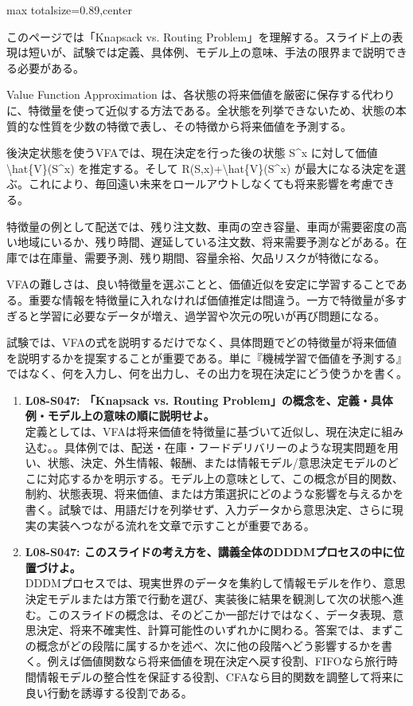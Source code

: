 \begin{minipage}[t]{0.58\textwidth}
\begin{adjustbox}{max totalsize={\textwidth}{0.89\textheight},center}
\begin{minipage}{\textwidth}\scriptsize
{}このページでは「Knapsack vs. Routing Problem」を理解する。スライド上の表現は短いが、試験では定義、具体例、モデル上の意味、手法の限界まで説明できる必要がある。\par
Value Function Approximation は、各状態の将来価値を厳密に保存する代わりに、特徴量を使って近似する方法である。全状態を列挙できないため、状態の本質的な性質を少数の特徴で表し、その特徴から将来価値を予測する。\par
後決定状態を使うVFAでは、現在決定を行った後の状態 S\textasciicircum{}x に対して価値 \textbackslash{}hat\{V\}(S\textasciicircum{}x) を推定する。そして R(S,x)+\textbackslash{}hat\{V\}(S\textasciicircum{}x) が最大になる決定を選ぶ。これにより、毎回遠い未来をロールアウトしなくても将来影響を考慮できる。\par
特徴量の例として配送では、残り注文数、車両の空き容量、車両が需要密度の高い地域にいるか、残り時間、遅延している注文数、将来需要予測などがある。在庫では在庫量、需要予測、残り期間、容量余裕、欠品リスクが特徴になる。\par
VFAの難しさは、良い特徴量を選ぶことと、価値近似を安定に学習することである。重要な情報を特徴量に入れなければ価値推定は間違う。一方で特徴量が多すぎると学習に必要なデータが増え、過学習や次元の呪いが再び問題になる。\par
試験では、VFAの式を説明するだけでなく、具体問題でどの特徴量が将来価値を説明するかを提案することが重要である。単に『機械学習で価値を予測する』ではなく、何を入力し、何を出力し、その出力を現在決定にどう使うかを書く。\par{}\begin{enumerate}\item \textbf{L08-S047: 「Knapsack vs. Routing Problem」の概念を、定義・具体例・モデル上の意味の順に説明せよ。}\\定義としては、VFAは将来価値を特徴量に基づいて近似し、現在決定に組み込む。。具体例では、配送・在庫・フードデリバリーのような現実問題を用い、状態、決定、外生情報、報酬、または情報モデル/意思決定モデルのどこに対応するかを明示する。モデル上の意味として、この概念が目的関数、制約、状態表現、将来価値、または方策選択にどのような影響を与えるかを書く。試験では、用語だけを列挙せず、入力データから意思決定、さらに現実の実装へつながる流れを文章で示すことが重要である。\item \textbf{L08-S047: このスライドの考え方を、講義全体のDDDMプロセスの中に位置づけよ。}\\DDDMプロセスでは、現実世界のデータを集約して情報モデルを作り、意思決定モデルまたは方策で行動を選び、実装後に結果を観測して次の状態へ進む。このスライドの概念は、そのどこか一部だけではなく、データ表現、意思決定、将来不確実性、計算可能性のいずれかに関わる。答案では、まずこの概念がどの段階に属するかを述べ、次に他の段階へどう影響するかを書く。例えば価値関数なら将来価値を現在決定へ戻す役割、FIFOなら旅行時間情報モデルの整合性を保証する役割、CFAなら目的関数を調整して将来に良い行動を誘導する役割である。\end{enumerate}

\end{minipage}
\end{adjustbox}
\end{minipage}
